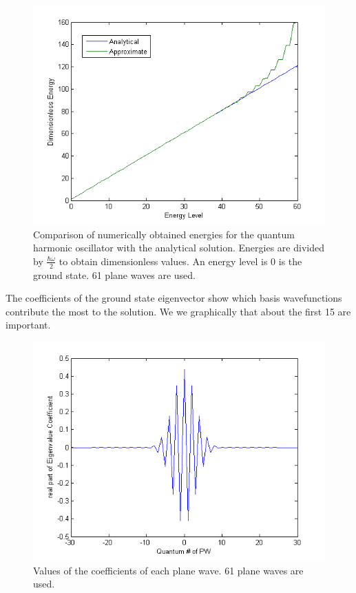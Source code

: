\documentclass[12pt, a4paper, twocolumn]{article}
\begin{document}
\begin{figure}[h!]
  \centering
    \includegraphics[scale=0.5]{a2.png}
	\caption{Comparison of numerically obtained energies for the quantum harmonic oscillator with the analytical solution. Energies are divided by $\frac{\hbar\omega}{2}$ to obtain dimensionless values. An energy level is 0 is the ground state. 61 plane waves are used.}
	\label{fig:a2}
\end{figure}

The coefficients of the ground state eigenvector show which basis wavefunctions contribute the most to the solution. We we graphically that about the first 15 are important.

\begin{figure}[h!]
  \centering
    \includegraphics[scale=0.5]{a3.png}
	\caption{Values of the coefficients of each plane wave. 61 plane waves are used.}
	\label{fig:a3}
\end{figure}
\end{document}
